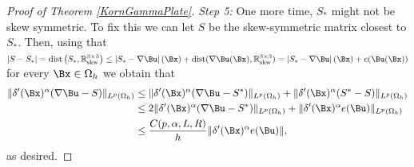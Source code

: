 \begin{proof}[Proof of Theorem \ref{KornGammaPlate}]
\textit{Step 5:} One more time, $S_*$ might not be skew symmetric. To fix this we can let $S$ be the skew-symmetric matrix closest to $S_*$. Then, using that $\left|S-S_*\right|= \operatorname{dist}\left(S_*, \mathbb{R}_{\mathrm{skw}}^{3 \times 3}\right) \leq\left|S_*-\nabla \Bu\right|(\Bx)+\operatorname{dist}(\nabla \Bu(\Bx), \mathbb{R}_{\mathrm{skw}}^{3 \times 3})=\left|S_*-\nabla \Bu\right|(\Bx)+e(\Bu(\Bx))$  for every $\Bx\in\Omega_h$ we obtain that
\begin{align*}
\|\delta'(\Bx)^\alpha(\nabla \Bu-S)\|_{L^p(\Omega_h)}&\leq \|\delta'(\Bx)^\alpha(\nabla \Bu-S^*)\|_{L^p(\Omega_h)}+\|\delta'(\Bx)^\alpha(S^*-S)\|_{L^p(\Omega_h)}\\
&\leq 2\|\delta'(\Bx)^\alpha(\nabla \Bu-S^*)\|_{L^p(\Omega_h)} +\|\delta'(\Bx)^\alpha e(\Bu)\|_{L^p(\Omega_h)}\\ 
&\leq \frac{C(p,\alpha,L,R)}{h} \|\delta'(\Bx)^\alpha e(\Bu)\|,
\end{align*}
as desired.

\end{proof}


